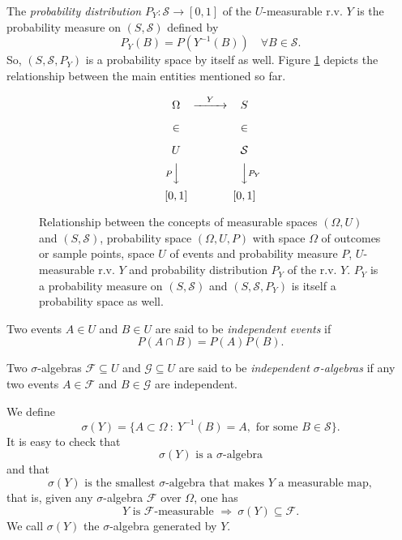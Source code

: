 The {\it probability distribution} $P_Y:\mathcal{S}\rightarrow [0,1]$ of the $U$-measurable r.v. $Y$
is the probability measure on $(S,\mathcal{S})$ defined by
\begin{equation*}
P_Y(B) = P(Y^{-1}(B))\quad\forall B\in\mathcal{S}.
\end{equation*}
So, $(S,\mathcal{S},P_Y)$ is a probability space by itself as well.
Figure \ref{fig-rv-diagram} depicts the relationship between the main entities mentioned so far.

\begin{figure}[h]
\[
\begin{CD}
\Omega   @>Y>> S           \\
\in      @.    \in         \\
U        @.    \mathcal{S} \\
@VP VV         @VVP_Y V    \\
[0,1]    @.    [0,1]
\end{CD}
\]
\caption{Relationship between the concepts of
measurable spaces $(\Omega,U)$ and $(S,\mathcal{S})$,
probability space $(\Omega,U,P)$ with
space $\Omega$ of outcomes or sample points,
space $U$ of events and
probability measure $P$,
$U$-measurable r.v. $Y$ and
probability distribution $P_Y$ of the r.v. $Y$.
$P_Y$ is a probability measure on $(S,\mathcal{S})$ and
$(S,\mathcal{S},P_Y)$ is itself a probability space as well.
}
\label{fig-rv-diagram}
\end{figure}

Two events $A\in U$ and $B\in U$ are said to be {\it independent events} if
\begin{equation*}
P(A\cap B)=P(A)P(B).
\end{equation*}

Two $\sigma$-algebras $\mathcal{F}\subseteq U$ and $\mathcal{G}\subseteq U$ are said to be {\it independent $\sigma$-algebras} if
any two events $A\in\mathcal{F}$ and $B\in\mathcal{G}$ are independent.

We define
\begin{equation*}
\sigma(Y) = \{A\subset\Omega~:~Y^{-1}(B)=A,\text{ for some }B\in\mathcal{S}\}.
\end{equation*}
It is easy to check that
\begin{equation*}
\sigma(Y)\text{ is a }\sigma\text{-algebra}
\end{equation*}
and that
\begin{equation*}
\sigma(Y)\text{ is the smallest }\sigma\text{-algebra}\text{ that makes }Y\text{ a measurable map},
\end{equation*}
that is, given any $\sigma$-algebra $\mathcal{F}$ over $\Omega$, one has
\begin{equation}\label{eq-property-of-generated-sigma-alg}
Y\text{ is }\mathcal{F}\text{-measurable }\Rightarrow~\sigma(Y)\subseteq\mathcal{F}.
\end{equation}
We call $\sigma(Y)$ the $\sigma$-algebra generated by $Y$.


